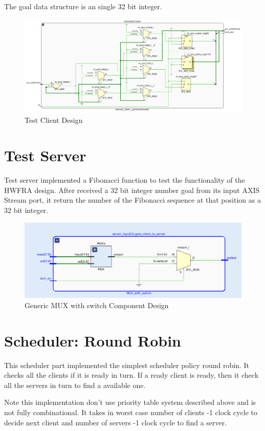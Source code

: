 The goal data structure is an single 32 bit integer.
\begin{figure}[htb]
	\centering
	\includegraphics[width=.8\linewidth]{figures/Client.png}
	\caption{Test Client Design}
	\label{fig:client-tb}
\end{figure}
\section{Test Server}

Test server implemented a Fibonacci function to test the functionality of the HWFRA design. After received a 32 bit integer number goal from its input AXIS Stream port, it return the number of the Fibonacci sequence at that position as a 32 bit integer.
\begin{figure}[htb]
	\centering
	\includegraphics[width=.8\linewidth]{figures/mux-w-s.png}
	\caption{Generic MUX with switch Component Design}
	\label{fig:server-tb}
\end{figure}
\section{Scheduler: Round Robin }

This scheduler part implemented the simplest scheduler policy round robin. It checks all the clients if it is ready in turn. If a ready client is ready, then it check all the servers in turn to find a available one.

Note this implementation don't use priority table system described above and is not fully combinational. It takes in worst case number of clients -1 clock cycle to decide next client and number of servers -1 clock cycle to find a server.

